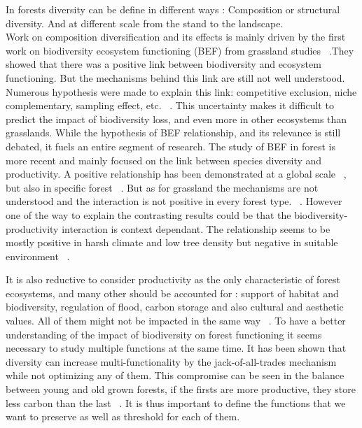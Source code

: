 \documentclass{article}
\begin{document}
In forests diversity can be define in different ways : Composition or structural diversity. And at different scale from the stand to the landscape.\\
Work on composition diversification and its effects is mainly driven by the first work on biodiversity ecosystem functioning (BEF) from grassland studies ~\autocite{tilmanBiodiversityPopulationEcosystem1996}.They showed that there was a positive link between biodiversity and ecosystem functioning. But the mechanisms behind this link are still not well understood. Numerous hypothesis were made to explain this link: competitive exclusion, niche complementary, sampling effect, etc. ~\autocite{aliBiodiversityEcosystemFunctioning2023}. This uncertainty makes it difficult to predict the impact of biodiversity loss, and even more in other ecosystems than grasslands.
While the hypothesis of BEF relationship, and its relevance is still debated, it fuels an entire segment of research.
The study of BEF in forest is more recent and mainly focused on the link between species diversity and productivity. A positive relationship has been demonstrated at a global scale ~\autocite{liangPositiveBiodiversityproductivityRelationship2016}, but also in specific forest ~\autocite{morinTreeSpeciesRichness2011,paquetteEffectBiodiversityTree2011,jourdanManagingMixedStands2021}. But as for grassland the mechanisms are not understood and the interaction is not positive in every forest type. ~\autocite{forresterReviewProcessesDiversity2016}.
However one of the way to explain the contrasting results could be that the biodiversity-productivity interaction is context dependant. The relationship seems to be mostly positive in harsh climate and low tree density but negative in suitable environment ~\autocite{juckerClimateModulatesEffects2016}.

It is also reductive to consider productivity as the only characteristic of forest ecosystems, and many other should be accounted for : support of habitat and biodiversity, regulation of flood, carbon storage and also cultural and aesthetic values.
All of them might not be impacted in the same way ~\autocite{korboulewskyHowTreeDiversity2016}.
To have a better understanding of the impact of biodiversity on forest functioning it seems necessary to study multiple functions at the same time. It has been shown that diversity can increase multi-functionality by the jack-of-all-trades mechanism ~\autocite{vanderplasJackofalltradesEffectsDrive2016} while not optimizing any of them. This compromise can be seen in the balance between young and old grown forests, if the firsts are more productive, they store less carbon than the last ~\autocite{caspersenSuccessionalDiversityForest2001}. It is thus important to define the functions that we want to preserve as well as threshold for each of them.
\end{document}
